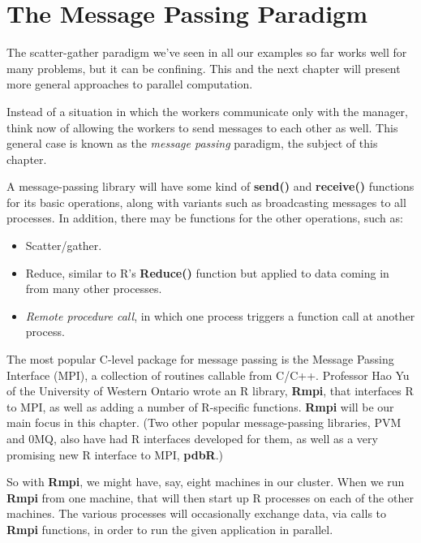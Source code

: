 \chapter{The Message Passing Paradigm} 
\label{chap:msgpass}


The scatter-gather paradigm we've seen in all our examples so far works
well for many problems, but it can be confining.  This and the next
chapter will present more general approaches to parallel computation.

Instead of a situation in which the workers communicate only with the
manager, think now of allowing the workers to send messages to each
other as well.  This general case is known as the {\it message passing}
paradigm, the subject of this chapter.

A message-passing library will have some kind of {\bf send()} and {\bf
receive()} functions for its basic operations, along with variants such
as broadcasting messages to all processes.  In addition, there may be
functions for the other operations, such as:

\begin{itemize}

\item Scatter/gather.

\item Reduce, similar to R's {\bf Reduce()} function but applied to data
coming in from many other processes.

\item {\it Remote procedure call}, in which one process triggers a
function call at another process. 

\end{itemize}

The most popular C-level package for message passing is the Message
Passing Interface (MPI), a collection of routines callable from C/C++.
Professor Hao Yu of the University of Western Ontario wrote an R
library, {\bf Rmpi}, that interfaces R to MPI, as well as adding a
number of R-specific functions.  {\bf Rmpi} will be our main focus in
this chapter.  (Two other popular message-passing libraries, PVM and
0MQ, also have had R interfaces developed for them, as well as a very
promising new R interface to MPI, {\bf pdbR}.)

So with {\bf Rmpi}, we might have, say, eight machines in our cluster.
When we run {\bf Rmpi} from one machine, that will then start up R
processes on each of the other machines.  The various processes will
occasionally exchange data, via calls to {\bf Rmpi} functions, in order
to run the given application in parallel.

